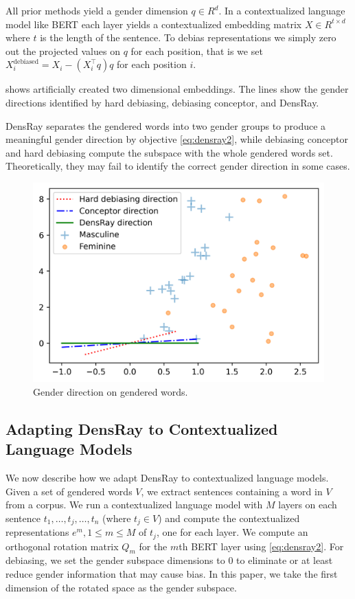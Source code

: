 All prior methods yield a gender dimension $q \in R^d$. In a contextualized language model like BERT each layer yields a contextualized embedding matrix $X \in R^{t \times d}$ where $t$ is the length of the sentence. To debias representations we simply zero out the projected values on $q$ for each position, that is we set $X^{\text{debiased}}_i = X_i -  (X_i^\intercal q) q$ for each position $i$.

  shows artificially created two dimensional embeddings. The lines show the gender directions identified by hard debiasing, debiasing conceptor, and DensRay. 
 
 DensRay separates the gendered words into two gender groups to produce a meaningful gender direction by objective \eqref{eq:densray2}, while debiasing conceptor and hard debiasing compute the subspace with the whole gendered words set. Theoretically, they may fail to identify the correct gender direction in some cases. 
\begin{figure}[h]
	\centering
	\includegraphics[width=0.5\linewidth]{examples.png}
	\caption{Gender direction on gendered words.}
\end{figure}

\subsection{Adapting DensRay to Contextualized Language Models}
We now describe how we adapt DensRay to contextualized
language models. Given a set of gendered words
$V$, we extract sentences containing a word in $V$ from a
corpus. We run a contextualized language model
with $M$ layers
on each
sentence
$t_1,\ldots,t_j,\ldots,t_n$ (where $t_j \in V$)
and compute the contextualized representations $e^m, 1\leq m
\leq M$ of $t_j$, one for each layer. 
We compute an orthogonal rotation
matrix $Q_m$ for the $m$th BERT layer using \eqref{eq:densray2}.
For debiasing, we set the gender subspace dimensions to $0$ to eliminate or at least reduce gender information that may cause bias. In this paper, we take the first dimension of the rotated space as the gender subspace.


